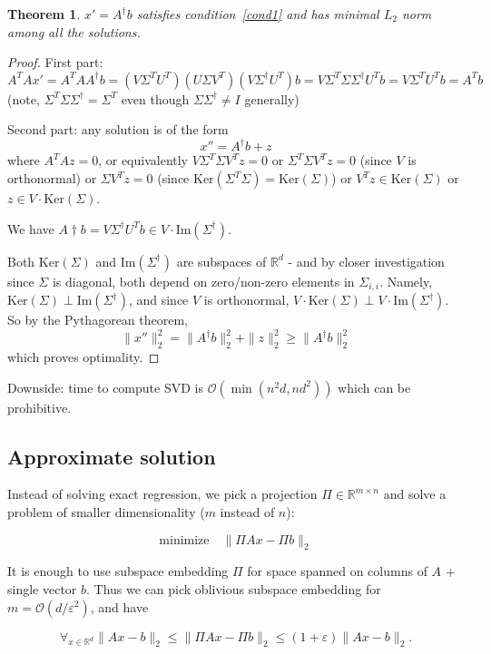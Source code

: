 \documentclass[11pt]{article}
\newtheorem{theorem}{Theorem}
\newcommand{\bigo}{\mathcal{O}}
\begin{document}
\begin{theorem}
$x' = A^\dagger b$ satisfies condition~\eqref{cond1} and has minimal $L_2$ norm among all the solutions.
\end{theorem}
\begin{proof}
First part:
$$A^TA x' = A^TA A^{\dagger} b = (V 
\Sigma^T U^T  ) (U \Sigma V^T) (V \Sigma^{\dagger} U^T) b = V \Sigma^T \Sigma \Sigma^\dagger U^T b = V \Sigma^T U^T b = A^T b$$
(note, $\Sigma^T \Sigma \Sigma^\dagger = \Sigma^T$ even though $\Sigma \Sigma^\dagger \not= I$ generally)

Second part:
any solution is of the form
$$x'' = A^\dagger b + z$$
where $A^TAz = 0$, or equivalently $V \Sigma^T \Sigma V^T z = 0$ or $\Sigma^T \Sigma V^T z = 0$ (since $V$ is orthonormal) or $\Sigma V^T z = 0$ (since $\textrm{Ker}(\Sigma^T \Sigma) = \textrm{Ker}(\Sigma)$) or $V^Tz \in \textrm{Ker}(\Sigma)$ or $z \in V \cdot \textrm{Ker}(\Sigma)$.

We have $A\dagger b = V \Sigma^\dagger U^T b \in V \cdot \textrm{Im}(\Sigma^\dagger)$.

Both $\textrm{Ker}(\Sigma)$ and $\textrm{Im}(\Sigma^{\dagger})$ are subspaces of $\mathbb{R}^{d}$ - and by closer investigation since $\Sigma$ is diagonal, both depend on zero/non-zero elements in $\Sigma_{i,i}$. Namely, $\textrm{Ker}(\Sigma) \perp \textrm{Im}(\Sigma^\dagger)$, and since $V$ is orthonormal, $V \cdot \textrm{Ker}(\Sigma) \perp V \cdot \textrm{Im}(\Sigma^\dagger)$. So by the Pythagorean theorem,
$$\|x''\|_2^2 = \|A^{\dagger} b\|_2^2 + \|z\|_2^2 \ge  \|A^{\dagger} b\|_2^2$$
which proves optimality.
\end{proof}

Downside: time to compute SVD is $\bigo(\min(n^2d, nd^2))$ which can be prohibitive.

\subsection{Approximate solution \cite{10.1109/FOCS.2006.37}}
Instead of solving exact regression, we pick a projection $\Pi \in \mathbb{R}^{m \times n}$ and solve a problem of smaller dimensionality ($m$ instead of $n$):

$$\textrm{minimize}\quad \|\Pi A x - \Pi b\|_2$$

It is enough to use subspace embedding $\Pi$ for space spanned on columns of $A$  + single vector $b$. Thus we can pick oblivious subspace embedding for $m = \bigo(d/\varepsilon^2)$, and have

$$\forall_{x \in \mathbb{R}^d} \|A x - b\|_2 \le \|\Pi A x - \Pi b\|_2 \le (1+\varepsilon) \| A x - b\|_2.$$
\end{document}
